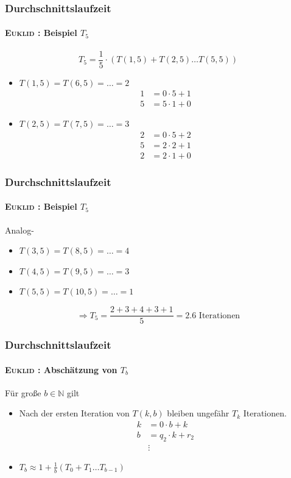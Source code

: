 \documentclass[•]{beamer}
\begin{document}
\begin{frame}	
		\frametitle{Durchschnittslaufzeit}
	\framesubtitle{\textsc{Euklid} : Beispiel $T_5$}
$$T_5 = \frac{1}{5}\cdot (T(1,5) + T(2,5) \dots T(5,5))$$	
	\begin{itemize}
	\item $T(1,5) = T(6,5) = \dots = 2$
	\setcounter{equation}{0}
	\begin{align}
	1&=0\cdot 5 + 1	\\
	5&=5\cdot 1 + 0
	\end{align}
	
	\setcounter{equation}{0}
	\item $T(2,5) = T(7,5) = \dots = 3$
	\begin{align}
	2&=0\cdot 5 + 2	\\
	5&=2\cdot 2 + 1 \\
	2&= 2\cdot 1+0
	\end{align}
	\end{itemize}
	
	\end{frame}
	

\begin{frame}	
		\frametitle{Durchschnittslaufzeit}
	\framesubtitle{\textsc{Euklid} : Beispiel $T_5$}
	Analog-
	\begin{itemize}
	\item $T(3,5) = T(8,5) = \dots = 4$
	\item $T(4,5) = T(9,5) = \dots = 3$
	\item $T(5,5) = T(10,5) = \dots = 1$
	\end{itemize}
	 $$\Rightarrow T_5 = \frac{2+3+4+3+1}{5} = 2.6\text{ Iterationen}$$
	\end{frame}	
	
	

	\begin{frame}	
		\frametitle{Durchschnittslaufzeit}
	\framesubtitle{\textsc{Euklid} : Absch\"atzung von $T_b$}
	F\"ur gro{\ss}e $b \in \mathbb{N}$ gilt
	\begin{itemize}
	\item Nach der ersten Iteration von $T(k,b)$ bleiben ungef\"ahr $T_{k}$ Iterationen.
	\begin{align*}
	k&=0\cdot b + k\\
	b&=q_{2}\cdot k + r_2\\
	&\vdots
\end{align*}		
	\item $T_b \approx 1 + \frac{1}{b} (T_0 + T_1 \dots T_{b-1})$
	\end{itemize}
\end{frame}		
\end{document}

